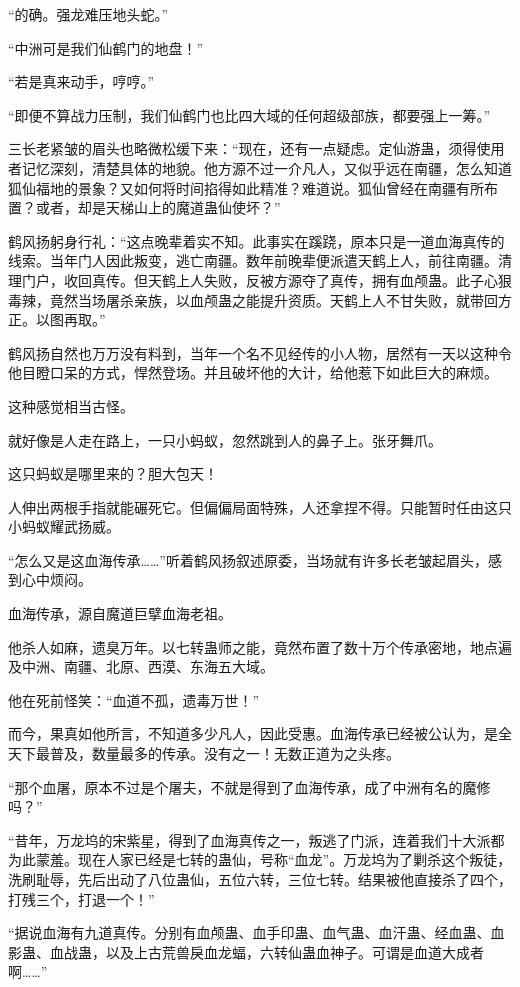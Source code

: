 \begin{this_body}
“的确。强龙难压地头蛇。”

“中洲可是我们仙鹤门的地盘！”

“若是真来动手，哼哼。”

“即便不算战力压制，我们仙鹤门也比四大域的任何超级部族，都要强上一筹。”

三长老紧皱的眉头也略微松缓下来：“现在，还有一点疑虑。定仙游蛊，须得使用者记忆深刻，清楚具体的地貌。他方源不过一介凡人，又似乎远在南疆，怎么知道狐仙福地的景象？又如何将时间掐得如此精准？难道说。狐仙曾经在南疆有所布置？或者，却是天梯山上的魔道蛊仙使坏？”

鹤风扬躬身行礼：“这点晚辈着实不知。此事实在蹊跷，原本只是一道血海真传的线索。当年门人因此叛变，逃亡南疆。数年前晚辈便派遣天鹤上人，前往南疆。清理门户，收回真传。但天鹤上人失败，反被方源夺了真传，拥有血颅蛊。此子心狠毒辣，竟然当场屠杀亲族，以血颅蛊之能提升资质。天鹤上人不甘失败，就带回方正。以图再取。”

鹤风扬自然也万万没有料到，当年一个名不见经传的小人物，居然有一天以这种令他目瞪口呆的方式，悍然登场。并且破坏他的大计，给他惹下如此巨大的麻烦。

这种感觉相当古怪。

就好像是人走在路上，一只小蚂蚁，忽然跳到人的鼻子上。张牙舞爪。

这只蚂蚁是哪里来的？胆大包天！

人伸出两根手指就能碾死它。但偏偏局面特殊，人还拿捏不得。只能暂时任由这只小蚂蚁耀武扬威。

“怎么又是这血海传承……”听着鹤风扬叙述原委，当场就有许多长老皱起眉头，感到心中烦闷。

血海传承，源自魔道巨擘血海老祖。

他杀人如麻，遗臭万年。以七转蛊师之能，竟然布置了数十万个传承密地，地点遍及中洲、南疆、北原、西漠、东海五大域。

他在死前怪笑：“血道不孤，遗毒万世！”

而今，果真如他所言，不知道多少凡人，因此受惠。血海传承已经被公认为，是全天下最普及，数量最多的传承。没有之一！无数正道为之头疼。

“那个血屠，原本不过是个屠夫，不就是得到了血海传承，成了中洲有名的魔修吗？”

“昔年，万龙坞的宋紫星，得到了血海真传之一，叛逃了门派，连着我们十大派都为此蒙羞。现在人家已经是七转的蛊仙，号称“血龙”。万龙坞为了剿杀这个叛徒，洗刷耻辱，先后出动了八位蛊仙，五位六转，三位七转。结果被他直接杀了四个，打残三个，打退一个！”

“据说血海有九道真传。分别有血颅蛊、血手印蛊、血气蛊、血汗蛊、经血蛊、血影蛊、血战蛊，以及上古荒兽戾血龙蝠，六转仙蛊血神子。可谓是血道大成者啊……”


\end{this_body}
